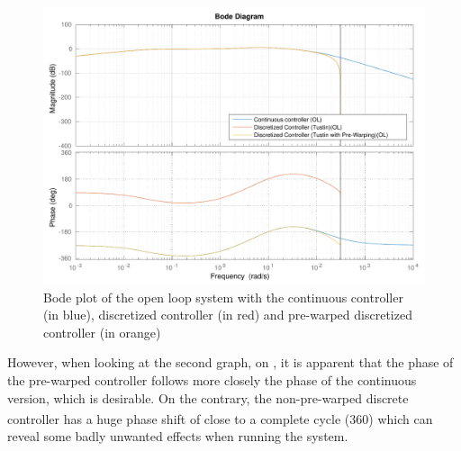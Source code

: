 %
\begin{figure}[H]
  \centering
  \includegraphics[scale=.6]{figures/prewarpVsNoPrewarpVsContinuousBodeOpenLoop.pdf}
  \caption{Bode plot of the open loop system with the continuous controller\\(in blue), discretized controller (in red) and pre-warped discretized controller (in orange)}
  \label{fig:bodePrewarpVsNoPrewarpVsContinuousOpenLoop}
\end{figure}
%
However, when looking at the second graph, on , it is apparent that the phase of the pre-warped controller follows more closely the phase of the continuous version, which is desirable. On the contrary, the non-pre-warped discrete controller has a huge phase shift of close to a complete cycle (\si{360^{\circ}}) which can reveal some badly unwanted effects when running the system.

